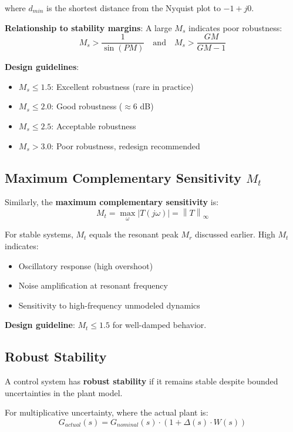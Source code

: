 where $d_{min}$ is the shortest distance from the Nyquist plot to $-1 + j0$.

\textbf{Relationship to stability margins}: A large $M_s$ indicates poor robustness:
\begin{equation}
    M_s > \frac{1}{\sin(PM)} \quad \text{and} \quad M_s > \frac{GM}{GM - 1}
\end{equation}

\textbf{Design guidelines}:
\begin{itemize}
    \item $M_s \leq 1.5$: Excellent robustness (rare in practice)
    \item $M_s \leq 2.0$: Good robustness ($\approx 6$ dB)
    \item $M_s \leq 2.5$: Acceptable robustness
    \item $M_s > 3.0$: Poor robustness, redesign recommended
\end{itemize}

\subsection{Maximum Complementary Sensitivity $M_t$}

Similarly, the \textbf{maximum complementary sensitivity} is:
\begin{equation}
    M_t = \max_{\omega} |T(j\omega)| = \left\| T \right\|_\infty
\end{equation}

For stable systems, $M_t$ equals the resonant peak $M_r$ discussed earlier. High $M_t$ indicates:
\begin{itemize}
    \item Oscillatory response (high overshoot)
    \item Noise amplification at resonant frequency
    \item Sensitivity to high-frequency unmodeled dynamics
\end{itemize}

\textbf{Design guideline}: $M_t \leq 1.5$ for well-damped behavior.

\subsection{Robust Stability}

A control system has \textbf{robust stability} if it remains stable despite bounded uncertainties in the plant model.

For multiplicative uncertainty, where the actual plant is:
\begin{equation}
    G_{actual}(s) = G_{nominal}(s) \cdot (1 + \Delta(s) \cdot W(s))
\end{equation}

